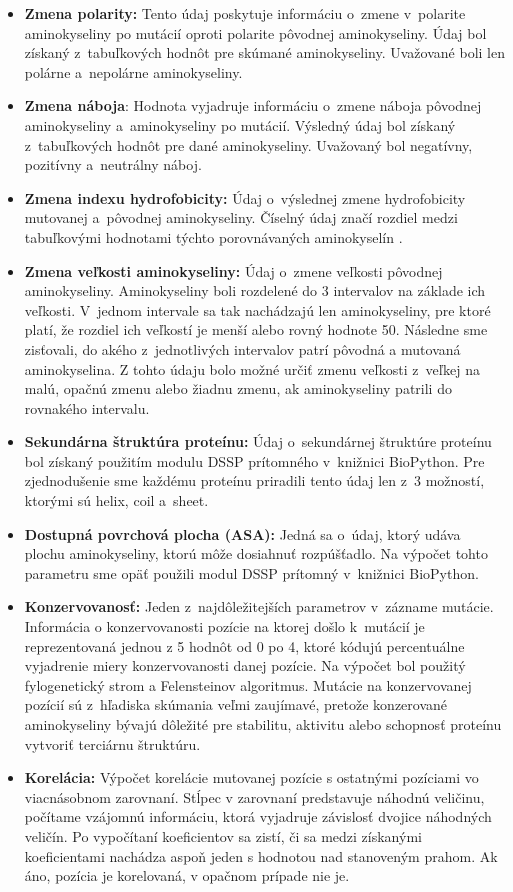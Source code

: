 \begin{itemize}
	\item \textbf{Zmena polarity:} Tento údaj poskytuje informáciu o zmene v polarite aminokyseliny po mutácií oproti polarite pôvodnej aminokyseliny. Údaj bol získaný z tabuľkových hodnôt pre skúmané aminokyseliny. Uvažované boli len polárne a nepolárne aminokyseliny.
	\item \textbf{Zmena náboja}: Hodnota vyjadruje informáciu o zmene náboja pôvodnej aminokyseliny a aminokyseliny po mutácií. Výsledný údaj bol získaný z tabuľkových hodnôt pre dané aminokyseliny. Uvažovaný bol negatívny, pozitívny a neutrálny náboj. 
	\item \textbf{Zmena indexu hydrofobicity:} Údaj o výslednej zmene hydrofobicity mutovanej a pôvodnej aminokyseliny. Číselný údaj značí rozdiel medzi tabuľkovými hodnotami týchto porovnávaných aminokyselín \cite{hydrophobicity}. 
	\item \textbf{Zmena veľkosti aminokyseliny:} Údaj o zmene veľkosti pôvodnej aminokyseliny. Aminokyseliny boli rozdelené do 3 intervalov na základe ich veľkosti. V jednom intervale sa tak nachádzajú len aminokyseliny, pre ktoré platí, že rozdiel ich veľkostí je menší alebo rovný hodnote 50. Následne sme zisťovali, do akého z jednotlivých intervalov patrí pôvodná a mutovaná aminokyselina. Z tohto údaju bolo možné určiť zmenu veľkosti z veľkej na malú, opačnú zmenu alebo žiadnu zmenu, ak aminokyseliny patrili do rovnakého intervalu.
	\item \textbf{Sekundárna štruktúra proteínu:} Údaj o sekundárnej štruktúre proteínu bol získaný použitím modulu DSSP prítomného v knižnici BioPython. Pre zjednodušenie sme každému proteínu priradili tento údaj len z 3 možností, ktorými sú helix, coil a sheet.
	\item \textbf{Dostupná povrchová plocha (ASA):} Jedná sa o údaj, ktorý udáva plochu aminokyseliny, ktorú môže dosiahnuť rozpúšťadlo. Na výpočet tohto parametru sme opäť použili modul DSSP prítomný v knižnici BioPython.
	\item \textbf{Konzervovanosť:} Jeden z najdôležitejších parametrov v zázname mutácie. Informácia o konzervovanosti pozície na ktorej došlo k mutácií je reprezentovaná
	jednou z 5 hodnôt od 0 po 4, ktoré kódujú percentuálne vyjadrenie miery konzervovanosti danej pozície. Na výpočet bol použitý fylogenetický strom a Felensteinov algoritmus. Mutácie na konzervovanej pozícií sú z hľadiska skúmania veľmi zaujímavé, pretože konzerované aminokyseliny bývajú dôležité pre stabilitu, aktivitu alebo schopnosť proteínu vytvoriť terciárnu štruktúru.
	\item \textbf{Korelácia:} Výpočet korelácie mutovanej pozície s ostatnými pozíciami vo viacnásobnom zarovnaní. Stĺpec v zarovnaní predstavuje náhodnú veličinu, počítame vzájomnú informáciu, ktorá vyjadruje závislosť dvojice náhodných veličín. Po vypočítaní koeficientov sa zistí, či sa medzi získanými koeficientami nachádza aspoň jeden s hodnotou nad stanoveným prahom. Ak áno, pozícia je korelovaná, v opačnom prípade nie je.
\end{itemize}

